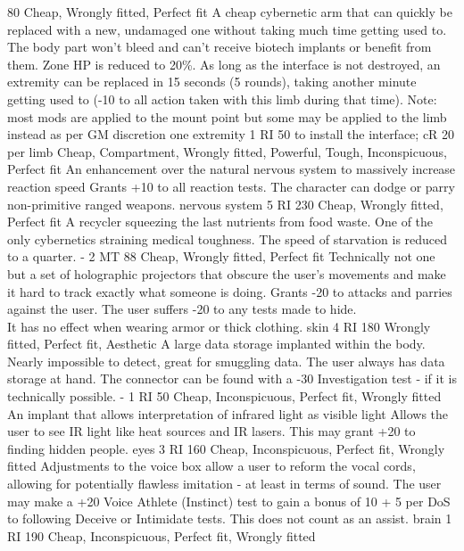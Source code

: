 \begin{multicols}{2}
    {80}
    {Cheap, Wrongly fitted, Perfect fit}
    {A cheap cybernetic arm that can quickly be replaced with a new, undamaged one without taking much time getting used to.}
    {The body part won't bleed and can't receive biotech implants or benefit from them.
	   Zone HP is reduced to 20\%. As long as the interface is not destroyed, an extremity can be replaced in 15 seconds (5 rounds), taking another minute getting used to (-10 to all action taken with this limb during that time).
	   Note: most mods are applied to the mount point but some may be applied to the limb instead as per GM discretion}
    {one extremity}
    {1 RI}
    {50 to install the interface; cR 20 per limb}
    {Cheap, Compartment, Wrongly fitted, Powerful, Tough, Inconspicuous, Perfect fit}
    {An enhancement over the natural nervous system to massively increase reaction speed}
    {Grants +10 to all reaction tests. The character can dodge or parry non-primitive ranged weapons.}
    {nervous system}
    {5 RI}
    {230}
    {Cheap, Wrongly fitted, Perfect fit}
    {A recycler squeezing the last nutrients from food waste. One of the only cybernetics straining medical toughness.}
    {The speed of starvation is reduced to a quarter.}
    {-}
    {2 MT}
    {88}
    {Cheap, Wrongly fitted, Perfect fit}
    {Technically not one but a set of holographic projectors that obscure the user's movements and make it hard to track exactly what someone is doing.}
    {Grants -20 to attacks and parries against the user.
       The user suffers -20 to any tests made to hide. \\
	   It has no effect when wearing armor or thick clothing.}
    {skin}
    {4 RI}
    {180}
    {Wrongly fitted, Perfect fit, Aesthetic}
    {A large data storage implanted within the body. Nearly impossible to detect, great for smuggling data.}
    {The user always has data storage at hand. The connector can be found with a -30 Investigation test - if it is technically possible.}
    {-}
    {1 RI}
    {50}
    {Cheap, Inconspicuous, Perfect fit, Wrongly fitted}
    {An implant that allows interpretation of infrared light as visible light}
    {Allows the user to see IR light like heat sources and IR lasers.
        This may grant +20 to finding hidden people.}
    {eyes}
    {3 RI}
    {160}
    {Cheap, Inconspicuous, Perfect fit, Wrongly fitted}
    {Adjustments to the voice box allow a user to reform the vocal cords, allowing for potentially flawless imitation - at least in terms of sound.}
    {The user may make a +20 Voice Athlete (Instinct) test to gain a bonus of 10 + 5 per DoS to following Deceive or Intimidate tests. This does not count as an assist.}
    {brain}
    {1 RI}
    {190}
    {Cheap, Inconspicuous, Perfect fit, Wrongly fitted}
\end{multicols}
